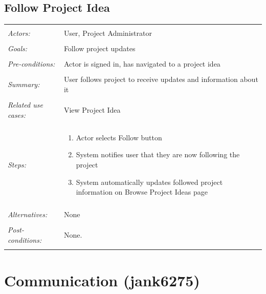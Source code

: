 \documentclass[11pt]{report}
\begin{document}
\subsection{Follow Project Idea}
\begin{tabular}{ p{2cm} p{12cm} }
 \hline
 \\
 \textit{Actors:} & User, Project Administrator \\ 
 \\
 \textit{Goals:} & Follow project updates  \\
 \\
 \textit{Pre-conditions:} & Actor is signed in, has navigated to a project idea  \\
 \\
 \textit{Summary:} &  User follows project to receive updates and information about it \\ 
 \\
 \textit{Related use cases:} & View Project Idea \\ 
 \\
 \textit{Steps:} & \begin{enumerate}
  \item Actor selects Follow button
  \item System notifies user that they are now following the project
  \item System automatically updates followed project information on Browse Project Ideas page
 \end{enumerate} \\
 \\
 \textit{Alternatives:} & None \\
 \\
 \textit{Post-conditions:} & None. \\
 \\
\hline
\end{tabular}



\section{Communication (jank6275)}
\end{document}
